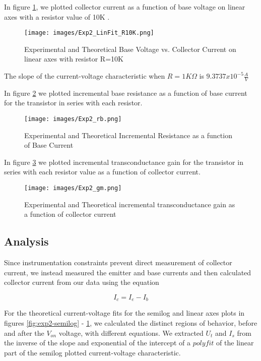 \documentclass{article}
\begin{document}
In figure \ref{fig:exp2-linfit-10K}, we plotted collector current as a function of base voltage on linear axes with a resistor value of 10K \Omega.

\begin{figure}[H]   
  \centering        
  \texttt{[image: images/Exp2\_LinFit\_R10K.png]}
  \caption{Experimental and Theoretical Base Voltage vs. Collector Current on linear axes with resistor R=10K \Omega}   
  \label{fig:exp2-linfit-10K}
\end{figure}

The slope of the current-voltage characteristic when $R=1K\Omega$ is $9.3737 x 10^{-5}\frac{A}{V}$
\newline

In figure \ref{fig:exp2-rb} we plotted incremental base resistance as a function of base current for the transistor in series with each resistor. 

\begin{figure}[H]   
  \centering        
  \texttt{[image: images/Exp2\_rb.png]}
  \caption{Experimental and Theoretical Incremental Resistance as a function of Base Current}   
  \label{fig:exp2-rb}
\end{figure}

In figure \ref{fig:exp2-gm} we plotted incremental transconductance gain  for the transistor in series with each resistor value as a function of collector current.

\begin{figure}[H]   
  \centering        
  \texttt{[image: images/Exp2\_gm.png]}
  \caption{Experimental and Theoretical incremental transconductance gain as a function of collector current}   
  \label{fig:exp2-gm}
\end{figure}

\subsection{Analysis}
Since instrumentation constraints prevent direct measurement of collector current, we instead measured the emitter and base currents and then calculated collector current from our data using the equation

\begin{centering}
    $$I_c = I_e - I_b$$
\end{centering}

For the theoretical current-voltage fits for the semilog and linear axes plots in figures \ref{fig:exp2-semilog} - \ref{fig:exp2-linfit-10K}, we calculated the distinct regions of behavior, before and after the $V_{on}$ voltage, with different equations.
We extracted $U_t$ and $I_s$ from the inverse of the slope and exponential of the intercept of a $polyfit$ of the linear part of the semilog plotted current-voltage characteristic.
\end{document}
